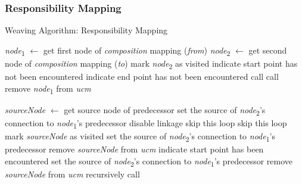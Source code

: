 \subsubsection{Responsibility Mapping} \label{sec:3.2.1.1}

\begin{algorithm}
    \caption{Weaving Algorithm: Responsibility Mapping}
    \label{alg:1}
	\begin{algorithmic}[1]
			\State \emph{node}\textsubscript{1} $\gets$ get first node of \emph{composition} mapping (\emph{from})
			\State \emph{node}\textsubscript{2} $\gets$ get second node of \emph{composition} mapping (\emph{to})
			\State mark \emph{node}\textsubscript{2} as visited
			\State indicate start point has not been encountered
			\State indicate end point has not been encountered
			\State call 
			\State call 
			\State remove \emph{node}\textsubscript{1} from \emph{ucm}
		\EndFunction
		
				\State \emph{sourceNode} $\gets$ get source node of predecessor
				 \label{alg:1.1}
					\State set the source of \emph{node}\textsubscript{2}'s connection to \emph{node}\textsubscript{1}'s predecessor
					\State disable linkage
					\State skip this loop
				\EndIf \label{alg:1.2}
				 \label{alg:1.3}
					\State skip this loop
					\State mark \emph{sourceNode} as visited
				\EndIf \label{alg:1.4}
				 \label{alg:1.5}
						\State set the source of \emph{node}\textsubscript{2}'s connection to \emph{node}\textsubscript{1}'s predecessor
						\State remove \emph{sourceNode} from \emph{ucm}
						\State indicate start point has been encountered
					\EndIf \label{alg:1.6}
				 \label{alg:1.7}
					\State set the source of \emph{node}\textsubscript{2}'s connection to \emph{node}\textsubscript{1}'s predecessor
						\State remove \emph{sourceNode} from \emph{ucm}
					\EndIf \label{alg:1.8}
				\Else
					\State recursively call  \label{alg:1.9}
				\EndIf
			\EndFor
		\EndFunction
		
	\end{algorithmic}
\end{algorithm}

